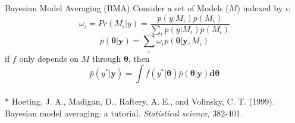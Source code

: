 \documentclass[ xcolor = pdftex, dvipsnames, table ]{beamer}
\begin{document}
\begin{frame}{Bayesian Model Averaging (BMA)}
      	Consider a set of Models ($M$) indexed by $\iota$: %
      	\begin{equation*}
	\omega_\iota = Pr(M_\iota|y) = \frac{ p(y|M_\iota)p(M_\iota) }{ \sum_\iota p(y|M_\iota)p(M_\iota) }
	\end{equation*}
      	\begin{equation*}
      	\bar p(\bm{\theta}|\bm{y}) = \sum_{\iota} \omega_\iota p(\bm{\theta}|\bm{y}, M_\iota)
      	\end{equation*}
	\indent if $f$ only depends on $M$ through $\bm{\theta}$, then
      	\begin{equation*}
      	\bar p(y^*|\bm{y}) = \bm{\int} f(y^*|\bm{\theta}) \bar p(\bm{\theta}|\bm{y}) \bm{d\theta}
      	\end{equation*}
$~$\\
\fontsize{6pt}{7.2}\selectfont
* Hoeting, J. A., Madigan, D., Raftery, A. E., and Volinsky, C. T. (1999). Bayesian model averaging: a tutorial. \textit{Statistical science}, 382-401.
\end{frame}

%
%
\end{document}
